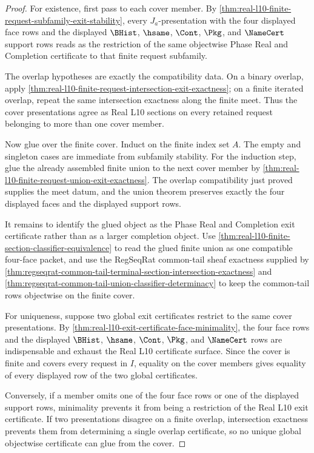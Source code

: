 \begin{proof}
For existence, first pass to each cover member. By \autoref{thm:real-l10-finite-request-subfamily-exit-stability}, every $J_a$-presentation with the four displayed face rows and the displayed $\BHist$, $\hsame$, $\Cont$, $\Pkg$, and $\NameCert$ support rows reads as the restriction of the same objectwise Phase Real and Completion certificate to that finite request subfamily.

The overlap hypotheses are exactly the compatibility data. On a binary overlap, apply \autoref{thm:real-l10-finite-request-intersection-exit-exactness}; on a finite iterated overlap, repeat the same intersection exactness along the finite meet. Thus the cover presentations agree as Real L10 sections on every retained request belonging to more than one cover member.

Now glue over the finite cover. Induct on the finite index set $A$. The empty and singleton cases are immediate from subfamily stability. For the induction step, glue the already assembled finite union to the next cover member by \autoref{thm:real-l10-finite-request-union-exit-exactness}. The overlap compatibility just proved supplies the meet datum, and the union theorem preserves exactly the four displayed faces and the displayed support rows.

It remains to identify the glued object as the Phase Real and Completion exit certificate rather than as a larger completion object. Use \autoref{thm:real-l10-finite-section-classifier-equivalence} to read the glued finite union as one compatible four-face packet, and use the RegSeqRat common-tail sheaf exactness supplied by \autoref{thm:regseqrat-common-tail-terminal-section-intersection-exactness} and \autoref{thm:regseqrat-common-tail-union-classifier-determinacy} to keep the common-tail rows objectwise on the finite cover.

For uniqueness, suppose two global exit certificates restrict to the same cover presentations. By \autoref{thm:real-l10-exit-certificate-face-minimality}, the four face rows and the displayed $\BHist$, $\hsame$, $\Cont$, $\Pkg$, and $\NameCert$ rows are indispensable and exhaust the Real L10 certificate surface. Since the cover is finite and covers every request in $I$, equality on the cover members gives equality of every displayed row of the two global certificates.

Conversely, if a member omits one of the four face rows or one of the displayed support rows, minimality prevents it from being a restriction of the Real L10 exit certificate. If two presentations disagree on a finite overlap, intersection exactness prevents them from determining a single overlap certificate, so no unique global objectwise certificate can glue from the cover.


\end{proof}
